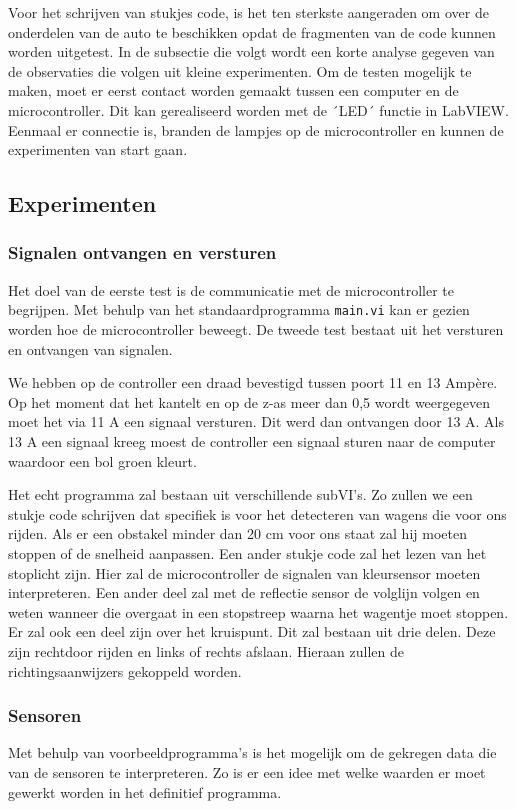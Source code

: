 \documentclass[a4paper,twoside,kulak]{kulakreport} %
\begin{document}
Voor het schrijven van stukjes code, is het ten sterkste aangeraden om over de onderdelen van de auto te beschikken opdat de fragmenten van de code kunnen worden uitgetest. In de subsectie die volgt wordt een korte analyse gegeven van de observaties die volgen uit kleine experimenten. Om de testen mogelijk te maken, moet er eerst contact worden gemaakt tussen een computer en de microcontroller. Dit kan gerealiseerd worden met de ´LED´ functie in LabVIEW. Eenmaal er connectie is, branden de lampjes op de microcontroller en kunnen de experimenten van start gaan.


\subsection{Experimenten}
\subsubsection{Signalen ontvangen en versturen}
Het doel van de eerste test is de communicatie met de microcontroller te begrijpen. Met behulp van het standaardprogramma \texttt{main.vi} kan er gezien worden hoe de microcontroller beweegt. 
De tweede test bestaat uit het versturen en ontvangen van signalen. 

We hebben op de controller een draad bevestigd tussen poort 11 en 13 Ampère. Op het moment dat het kantelt en op de z-as meer dan 0,5 wordt weergegeven moet het via 11 A een signaal versturen. Dit werd dan ontvangen door 13 A. Als 13 A een signaal kreeg moest de controller een signaal sturen naar de computer waardoor een bol groen kleurt. 

Het echt programma zal bestaan uit verschillende subVI's. Zo zullen we een stukje code schrijven dat specifiek is voor het detecteren van wagens die voor ons rijden. Als er een obstakel minder dan 20 cm voor ons staat zal hij moeten stoppen of de snelheid aanpassen. Een ander stukje code zal het lezen van het stoplicht zijn. Hier zal de microcontroller de signalen van kleursensor moeten interpreteren. Een ander deel zal met de reflectie sensor de volglijn volgen en weten wanneer die overgaat in een stopstreep waarna het wagentje moet stoppen.
Er zal ook een deel zijn over het kruispunt. Dit zal bestaan uit drie delen. Deze zijn rechtdoor rijden en links of rechts afslaan. Hieraan zullen de richtingsaanwijzers gekoppeld worden. 

\subsubsection{Sensoren}
Met behulp van voorbeeldprogramma's is het mogelijk om de gekregen data die van de sensoren te interpreteren. Zo is er een idee met welke waarden er moet gewerkt worden in het definitief programma. 
\end{document}
